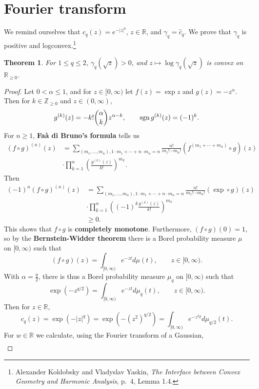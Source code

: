 \documentclass{article}
\newcommand{\sgn}{\ensuremath\mathrm{sgn}\,}
\newtheorem{theorem}{Theorem}
\theoremstyle{definition}
\begin{document}
\section{Fourier transform}
We remind ourselves that
$c_q(z) = e^{-|z|^q}$, $z \in \mathbb{R}$, 
and  $\gamma_q = \widehat{c}_q$.
We prove that $\gamma_q$ is positive and logconvex.\footnote{Alexander Koldobsky and
Vladyslav Yaskin, {\em The Interface between Convex Geometry and Harmonic Analysis},
p.~4, Lemma 1.4.}

\begin{theorem}
For $1 \leq q \leq 2$, $\gamma_q (\sqrt{z}) > 0$, and
$z \mapsto \log \gamma_q (\sqrt{z})$
is convex on $\mathbb{R}_{\geq 0}$.  
\end{theorem}
\begin{proof}
Let $0<\alpha \leq 1$, and for $z \in [0,\infty)$ let
 $f(z) = \exp z$ and $g(z) = -z^\alpha$. Then for $k \in \mathbb{Z}_{\geq 0}$ and
$z \in (0,\infty)$,
\[
g^{(k)}(z) = -k! \binom{\alpha}{k} z^{\alpha-k},
\qquad \sgn g^{(k)}(z) = (-1)^k.
\]
For $n \geq 1$,
\textbf{Fa\`a di Bruno's formula} tells us
\begin{align*}
(f \circ g)^{(n)}(z) &= \sum_{(m_1,\ldots,m_n), 1\cdot m_1+\cdots+n \cdot m_n=n} \frac{n!}{m_1! \cdots m_n!} (f^{(m_1+\cdots+m_n)} 
\circ g)(z)\\
& \cdot \prod_{k=1}^n \left( \frac{g^{(k)}(z)}{k!} \right)^{m_k}.
\end{align*}
Then 
\begin{align*}
(-1)^n (f \circ g)^{(n)}(z) &= \sum_{(m_1,\ldots,m_n), 1\cdot m_1+\cdots+n \cdot m_n=n} \frac{n!}{m_1! \cdots m_n!} 
(\exp \circ g)(z)\\
&\cdot  \prod_{k=1}^n \left( (-1)^k \frac{ g^{(k)}(z)}{k!} \right)^{m_k}\\
&\geq 0.
\end{align*}
This shows that $f \circ g$ is \textbf{completely monotone}. Furthermore,
$(f \circ g)(0) = 1$, so by the \textbf{Bernstein-Widder theorem}
there is a Borel probability measure $\mu$ on $[0,\infty)$ such that
\[
(f \circ g)(z) = \int_{[0,\infty)} e^{-zt} d\mu(t),\qquad z \in [0,\infty).
\]
With $\alpha= \frac{q}{2}$, there is thus a Borel probability measure $\mu_q$ on $[0,\infty)$ 
such that
\[
\exp(-z^{q/2}) = \int_{[0,\infty)} e^{-zt} d\mu_q(t),\qquad z \in [0,\infty).
\]
Then for $z \in \mathbb{R}$,
\[
c_q(z) = \exp(-|z|^q) = \exp(- (z^2)^{q/2}) =   \int_{[0,\infty)} e^{-z^2 t} d\mu_{q/2}(t).
\]
For $w \in \mathbb{R}$ we calculate, using the Fourier transform of a Gaussian,
\begin{align*}

\end{align*}
\end{proof}
\end{document}
